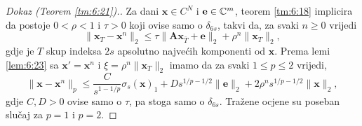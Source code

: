 \documentclass[a4paper,twoside,12pt]{memoir} %
\newcommand{\vect}[1]{\mathbf{#1}}
\renewcommand{\vec}{\vect}
\newcommand{\norm}[1]{\|{#1}\|}
\begin{document}
\begin{proof}[Dokaz (Teorem \ref{tm:6:21}).]
    Za dani $\vec x \in C^N$ i $\vec e \in \C^m$, teorem \ref{tm:6:18} implicira da postoje $0<\rho<1$ i $\tau > 0$ koji ovise samo o $\delta_{6s}$, takvi da, za svaki $n \geq 0$ vrijedi 
    \begin{equation*}
        \norm{\vec x_T - \vec x^n}_2 \leq \tau \norm{\vec{Ax}_{\bar T} + \vec e}_2 + \rho^n \norm{\vec x_T}_2,
    \end{equation*}
    gdje je $T$ skup indeksa $2s$ apsolutno najve\'cih komponenti od $\vec x$. Prema lemi \ref{lem:6:23} sa $\vec x' = \vec x^n$ i $\xi = \rho^n \norm{\vec x_T}_2$ imamo da za svaki $1 \leq p \leq 2$ vrijedi,
    \begin{equation*}
        \norm{\vec x - \vec x^n}_p \leq \frac{C}{s^{1-1/p}} \sigma_s(\vec x)_1 + D s^{1/p - 1/2} \norm{\vec e}_2 + 2 \rho^n s^{1/p - 1/2} \norm{\vec x}_2, 
    \end{equation*}
    gdje $C,D > 0$ ovise samo o $\tau$, pa stoga samo o $\delta_{6s}$. Tra\v{z}ene ocjene su poseban slu\v{c}aj za $p=1$ i $p=2$.
\end{proof}
\end{document}
